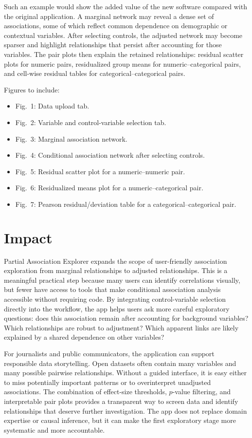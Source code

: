 \documentclass[11pt,a4paper]{article}
\begin{document}
Such an example would show the added value of the new software compared with the original application. A marginal network may reveal a dense set of associations, some of which reflect common dependence on demographic or contextual variables. After selecting controls, the adjusted network may become sparser and highlight relationships that persist after accounting for those variables. The pair plots then explain the retained relationships: residual scatter plots for numeric pairs, residualized group means for numeric--categorical pairs, and cell-wise residual tables for categorical--categorical pairs.

Figures to include:

\begin{itemize}
\item Fig.~1: Data upload tab.
\item Fig.~2: Variable and control-variable selection tab.
\item Fig.~3: Marginal association network.
\item Fig.~4: Conditional association network after selecting controls.
\item Fig.~5: Residual scatter plot for a numeric--numeric pair.
\item Fig.~6: Residualized means plot for a numeric--categorical pair.
\item Fig.~7: Pearson residual/deviation table for a categorical--categorical pair.
\end{itemize}

\section{Impact}
\label{sec:impact}

Partial Association Explorer expands the scope of user-friendly association exploration from marginal relationships to adjusted relationships. This is a meaningful practical step because many users can identify correlations visually, but fewer have access to tools that make conditional association analysis accessible without requiring code. By integrating control-variable selection directly into the workflow, the app helps users ask more careful exploratory questions: does this association remain after accounting for background variables? Which relationships are robust to adjustment? Which apparent links are likely explained by a shared dependence on other variables?

For journalists and public communicators, the application can support responsible data storytelling. Open datasets often contain many variables and many possible pairwise relationships. Without a guided interface, it is easy either to miss potentially important patterns or to overinterpret unadjusted associations. The combination of effect-size thresholds, $p$-value filtering, and interpretable pair plots provides a transparent way to screen data and identify relationships that deserve further investigation. The app does not replace domain expertise or causal inference, but it can make the first exploratory stage more systematic and more accountable.
\end{document}
